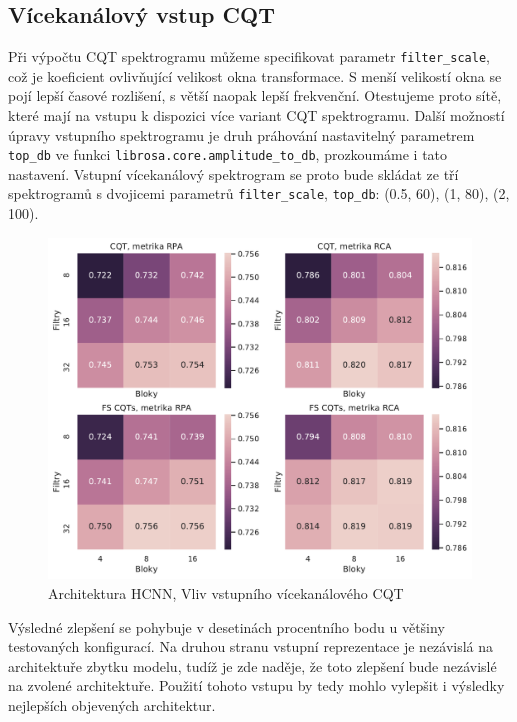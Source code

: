 \subsection{Vícekanálový vstup CQT}\label{exp:hcnn_multichannel}

Při výpočtu CQT spektrogramu můžeme specifikovat parametr \texttt{filter\_scale}, což je koeficient ovlivňující velikost okna transformace. S menší velikostí okna se pojí lepší časové rozlišení, s větší naopak lepší frekvenční. Otestujeme proto sítě, které mají na vstupu k dispozici více variant CQT spektrogramu. Další možností úpravy vstupního spektrogramu je druh práhování nastavitelný parametrem \texttt{top\_db} ve funkci \texttt{librosa.core.amplitude\_to\_db}, prozkoumáme i tato nastavení. Vstupní vícekanálový spektrogram se proto bude skládat ze tří spektrogramů s dvojicemi parametrů \texttt{filter\_scale}, \texttt{top\_db}: (0.5, 60), (1, 80), (2, 100).

\begin{figure}[h]\centering
    \includegraphics[scale=0.55]{../img/figures/spectrogram_fscqt}
\caption{Architektura HCNN, Vliv vstupního vícekanálového CQT}\label{obr:spectrogram_fscqt}
\end{figure}

Výsledné zlepšení se pohybuje v desetinách procentního bodu u většiny testovaných konfigurací. Na druhou stranu vstupní reprezentace je nezávislá na architektuře zbytku modelu, tudíž je zde naděje, že toto zlepšení bude nezávislé na zvolené architektuře. Použití tohoto vstupu by tedy mohlo vylepšit i výsledky nejlepších objevených architektur.

